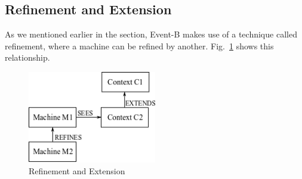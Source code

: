 \subsection{Refinement and Extension}\label{ref}
As we mentioned earlier in the section, Event-B makes use of a technique called refinement, where a machine can be refined by another. Fig.~\ref{fig:refine} shows this relationship.
%
\begin{figure}
\centering
\includegraphics[width=0.5\textwidth]{graphics/refinement.png}
\caption{Refinement and Extension}
\label{fig:refine}
\end{figure}
%
%
